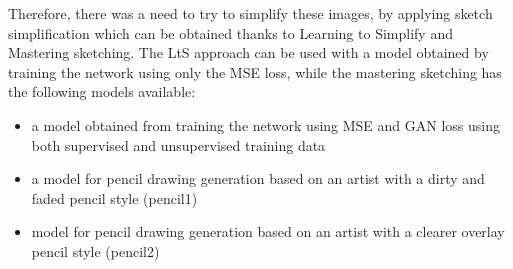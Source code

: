\noindent Therefore, there was a need to try to simplify these images, by applying sketch simplification which can be obtained thanks to Learning to Simplify and Mastering sketching. The LtS approach can be used with a model obtained by training the network using only the MSE loss, while the mastering sketching has the following models available:
%
\begin{itemize} 
\setlength{\itemsep}{1pt}
\setlength{\parskip}{0pt}
\setlength{\parsep}{0pt}
    \item a model obtained from training the network using MSE and GAN loss using both supervised and unsupervised training data
    \item a model for pencil drawing generation based on an artist with a dirty and faded pencil style (pencil1)
    \item model for pencil drawing generation based on an artist with a clearer overlay pencil style (pencil2)
\end{itemize}

